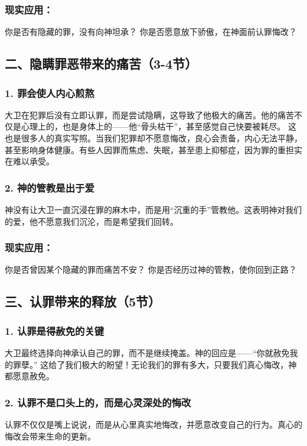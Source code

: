 \documentclass[a4paper, 12pt]{article}
\begin{document}
\subsubsection*{现实应用：}
你是否有隐藏的罪，没有向神坦承？
你是否愿意放下骄傲，在神面前认罪悔改？
\subsection*{二、隐瞒罪恶带来的痛苦（3-4节）}


\subsubsection*{1. 罪会使人内心煎熬}
大卫在犯罪后没有立即认罪，而是尝试隐瞒，这导致了他极大的痛苦。他的痛苦不仅是心理上的，也是身体上的——他“骨头枯干”，甚至感觉自己快要被耗尽。
这也是很多人的真实写照。当我们犯罪却不愿意悔改，良心会责备，内心无法平静，甚至影响身体健康。有些人因罪而焦虑、失眠，甚至患上抑郁症，因为罪的重担实在难以承受。

\subsubsection*{2. 神的管教是出于爱}
神没有让大卫一直沉浸在罪的麻木中，而是用“沉重的手”管教他。这表明神对我们的爱，他不愿意我们沉沦，而是希望我们回转。

\subsubsection*{现实应用：}

你是否曾因某个隐藏的罪而痛苦不安？
你是否经历过神的管教，使你回到正路？
\subsection*{三、认罪带来的释放（5节）}

\subsubsection*{1. 认罪是得赦免的关键}
大卫最终选择向神承认自己的罪，而不是继续掩盖。神的回应是——“你就赦免我的罪孽。”
这给了我们极大的盼望！无论我们的罪有多大，只要我们真心悔改，神都愿意赦免。

\subsubsection*{2. 认罪不是口头上的，而是心灵深处的悔改}
认罪不仅仅是嘴上说说，而是从心里真实地悔改，并愿意改变自己的行为。真心的悔改会带来生命的更新。
\end{document}
